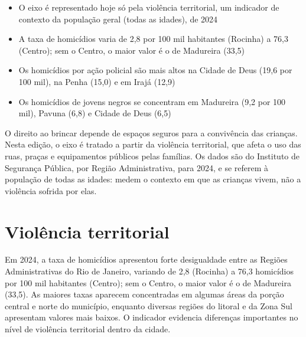 \begin{achados}\begin{itemize}

\item O eixo é representado hoje só pela violência territorial, um indicador de contexto da população geral (todas as idades), de 2024

\item A taxa de homicídios varia de 2,8 por 100 mil habitantes (Rocinha) a 76,3 (Centro); sem o Centro, o maior valor é o de Madureira (33,5)

\item Os homicídios por ação policial são mais altos na Cidade de Deus (19,6 por 100 mil), na Penha (15,0) e em Irajá (12,9)

\item Os homicídios de jovens negros se concentram em Madureira (9,2 por 100 mil), Pavuna (6,8) e Cidade de Deus (6,5)

\end{itemize}\end{achados}

O direito ao brincar depende de espaços seguros para a convivência das crianças. Nesta edição, o eixo é tratado a partir da violência territorial, que afeta o uso das ruas, praças e equipamentos públicos pelas famílias. Os dados são do Instituto de Segurança Pública, por Região Administrativa, para 2024, e se referem à população de todas as idades: medem o contexto em que as crianças vivem, não a violência sofrida por elas.

\section{Violência territorial}


Em 2024, a taxa de homicídios apresentou forte desigualdade entre as Regiões Administrativas do Rio de Janeiro, variando de 2,8 (Rocinha) a 76,3 homicídios por 100 mil habitantes (Centro); sem o Centro, o maior valor é o de Madureira (33,5). As maiores taxas aparecem concentradas em algumas áreas da porção central e norte do município, enquanto diversas regiões do litoral e da Zona Sul apresentam valores mais baixos. O indicador evidencia diferenças importantes no nível de violência territorial dentro da cidade.

